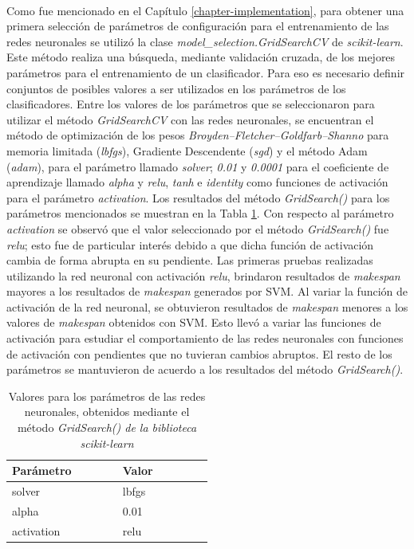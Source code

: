 \paragraph{} Como fue mencionado en el Capítulo \ref{chapter-implementation}, para obtener una primera selección de parámetros de configuración para el entrenamiento de las redes neuronales se utilizó la clase \textit{model\_selection.GridSearchCV} de \textit{scikit-learn}.
Este método realiza una búsqueda, mediante validación cruzada, de los mejores parámetros para el entrenamiento de un clasificador.
Para eso es necesario definir conjuntos de posibles valores a ser utilizados en los parámetros de los clasificadores.
Entre los valores de los parámetros que se seleccionaron para utilizar el método \textit{GridSearchCV} con las redes neuronales, se encuentran el método de optimización de los pesos \textit{Broyden–Fletcher–Goldfarb–Shanno} para memoria limitada (\textit{lbfgs}), Gradiente Descendente (\textit{sgd}) y el método Adam (\textit{adam}), para el parámetro llamado \textit{solver}; \textit{0.01} y \textit{0.0001} para el coeficiente de aprendizaje llamado \textit{alpha} y \textit{relu}, \textit{tanh} e \textit{identity} como funciones de activación para el parámetro \textit{activation}.
Los resultados del método \textit{GridSearch()} para los parámetros mencionados se muestran en la Tabla \ref{table:parametros}.
Con respecto al parámetro \textit{activation} se observó que el valor seleccionado por el método \textit{GridSearch()} fue \textit{relu}; esto fue de particular interés debido a que dicha función de activación cambia de forma abrupta en su pendiente. Las primeras pruebas realizadas utilizando la red neuronal con activación \textit{relu}, brindaron resultados de \textit{makespan} mayores a los resultados de \textit{makespan} generados por SVM. 
Al variar la función de activación de la red neuronal, se obtuvieron resultados de \textit{makespan} menores a los valores de \textit{makespan} obtenidos con SVM.
Esto llevó a variar las funciones de activación para estudiar el comportamiento de las redes neuronales con funciones de activación con pendientes que no tuvieran cambios abruptos.
El resto de los parámetros se mantuvieron de acuerdo a los resultados del método \textit{GridSearch()}.

\begin{table}[h!]
\centering
\begin{tabular}{ |p{0.25\linewidth}|p{0.25\linewidth}| } 
\hline
\textbf{Parámetro} & \textbf{Valor}\\
\hline
solver & lbfgs\\ 
\hline
alpha & 0.01\\ 
\hline
activation & relu\\ 
\hline
\end{tabular}
\caption{ Valores para los parámetros de las redes neuronales, obtenidos mediante el método \textit{GridSearch() de la biblioteca \textit{scikit-learn}}}
\label{table:parametros}
\end{table}


